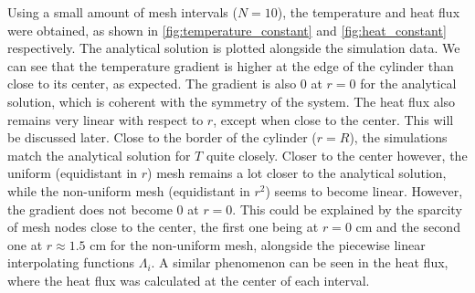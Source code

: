 Using a small amount of mesh intervals (\(N=10\)), the temperature and heat flux were obtained, as shown in \autoref{fig:temperature_constant} and \autoref{fig:heat_constant} respectively. The analytical solution is plotted alongside the simulation data. We can see that the temperature gradient is higher at the edge of the cylinder than close to its center, as expected. The gradient is also 0 at \(r=0\) for the analytical solution, which is coherent with the symmetry of the system. The heat flux also remains very linear with respect to \(r\), except when close to the center. This will be discussed later. Close to the border of the cylinder (\(r=R\)), the simulations match the analytical solution for $T$ quite closely. Closer to the center however, the uniform (equidistant in \(r\)) mesh remains a lot closer to the analytical solution, while the non-uniform mesh (equidistant in \(r^2\)) seems to become linear. However, the gradient does not become 0 at \(r=0\). This could be explained by the sparcity of mesh nodes close to the center, the first one being at \(r=0\) \si{\centi\meter} and the second one at \(r \approx 1.5\) \si{\centi\meter} for the non-uniform mesh, alongside the piecewise linear interpolating functions \(\Lambda_i\). A similar phenomenon can be seen in the heat flux, where the heat flux was calculated at the center of each interval.

